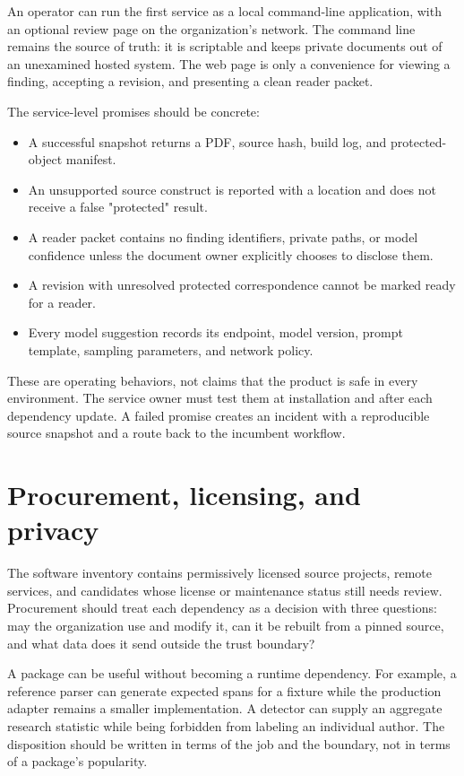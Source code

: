 An operator can run the first service as a local command-line application, with
an optional review page on the organization's network. The command line remains
the source of truth: it is scriptable and keeps private documents out of an
unexamined hosted system. The web page is only a convenience for viewing a
finding, accepting a revision, and presenting a clean reader packet.

The service-level promises should be concrete:

\begin{itemize}
\item A successful snapshot returns a PDF, source hash, build log, and
      protected-object manifest.
\item An unsupported source construct is reported with a location and does not
      receive a false "protected" result.
\item A reader packet contains no finding identifiers, private paths, or model
      confidence unless the document owner explicitly chooses to disclose them.
\item A revision with unresolved protected correspondence cannot be marked
      ready for a reader.
\item Every model suggestion records its endpoint, model version, prompt
      template, sampling parameters, and network policy.
\end{itemize}

These are operating behaviors, not claims that the product is safe in every
environment. The service owner must test them at installation and after each
dependency update. A failed promise creates an incident with a reproducible
source snapshot and a route back to the incumbent workflow.

\section{Procurement, licensing, and privacy}
\label{sec:ops-procurement}

The software inventory contains permissively licensed source projects, remote
services, and candidates whose license or maintenance status still needs
review. Procurement should treat each dependency as a decision with three
questions: may the organization use and modify it, can it be rebuilt from a
pinned source, and what data does it send outside the trust boundary?

A package can be useful without becoming a runtime dependency. For example, a
reference parser can generate expected spans for a fixture while the production
adapter remains a smaller implementation. A detector can supply an aggregate
research statistic while being forbidden from labeling an individual author.
The disposition should be written in terms of the job and the boundary, not in
terms of a package's popularity.

